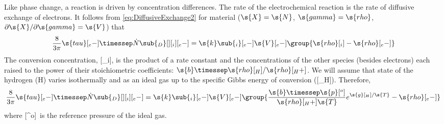 Like phase change, a reaction is driven by concentration differences.  The rate of the electrochemical reaction is the rate of diffusive exchange of electrons.  It follows from \autoref{eq:DiffusiveExchange2} for material ($\s{X} = \s{N}$, $\s{gamma} = \s{rho}$, $\partial\s{X}/\partial\s{gamma} = \s{V}$) that
\begin{equation}
  \label{eq:Reaction1a}
  \frac{8}{3\pi}\s{tau}[_e-]\timessep\dot{N}\sub{_D}[ ][_i][_e-] = \s{k}\sub{_i}[_e-]\s{V}[_e-]\group{\s{rho}[_i] - \s{rho}[_e-]}
\end{equation}
The conversion concentration, [_i], is the product of a rate constant and the concentrations of the other species (besides electrons) each raised to the power of their stoichiometric coefficients: $\s{b}\timessep\s{rho}[_H]/\s{rho}[_H+]$.  We will assume that state of the hydrogen (H) varies isothermally and as an ideal gas up to the specific Gibbs energy of conversion ([_H]).  Therefore,
\begin{equation}
  \label{eq:Reaction2a}
  \frac{8}{3\pi}\s{tau}[_e-]\timessep\dot{N}\sub{_D}[ ][_i][_e-] = \s{k}\sub{_i}[_e-]\s{V}[_e-]\group{\frac{\s{b}\timessep\s{p}[^o]}{\s{rho}[_H+]\s{T}}e^{\s{g}[_H]/\s{T}} - \s{rho}[_e-]}
\end{equation}
where [^o]~is the reference pressure of the ideal gas.  

